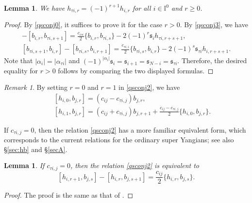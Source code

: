 \documentclass[11pt,reqno]{amsart}
\numberwithin{equation}{section}
\newtheorem{lem}[thm]{Lemma}
\theoremstyle{definition}
\theoremstyle{remark}
\newtheorem{rem}[thm]{Remark}
\newcommand{\beq}{\begin{equation}}
\newcommand{\eeq}{\end{equation}}
\newcommand{\fks}{\mathfrak{s}}
\newcommand{\gge}{\geqslant}
\newcommand{\ka}{{\mathfrak s}}
\def \H{h}
\def \X{b}
\def \I{\mathbb{I}}
\begin{document}
\begin{lem}\label{lem:sym-new}
We have $h_{\tau i,r}=(-1)^{r+1}h_{i,r}$ for all $i\in \I^0$ and $r\gge 0$.
\end{lem}
\begin{proof}
By \eqref{qsconj0}, it suffices to prove it for the case $r>0$. By \eqref{qsconj3}, we have
\begin{align*}
[\X_{i,r+1 },\X_{\tau i,s}]  - [\X_{i,r },\X_{\tau i,s+1 }] 
 =\frac{c_{i\tau i}}{2} \{\X_{i,r },\X_{\tau i,s }\}-2 (-1)^{r}\ka_i \H_{\tau i,r+s+1 },\\
[\X_{\tau i,s+1 },\X_{i,r }]   - [\X_{\tau i,s},\X_{i,r+1 }]
 =\frac{c_{\tau i, i}}{2} \{\X_{\tau i,s },\X_{i,r }\}-2 (-1)^{s}\ka_{\tau i} \H_{i,r+s+1 }.
\end{align*}
Note that $|\alpha_i|=|\alpha_{\tau i}|$ and $(-1)^{|\alpha_i|}\fks_i=\fks_{i+1}=\fks_{N-i}=\fks_{\tau i}$. Therefore, the desired equality for $r>0$ follows by comparing the two displayed formulas.
\end{proof}

\begin{rem}
By setting $r=0$ and $r=1$ in \eqref{qsconj2}, we have
\begin{align}
\label{qsconj5'}
&\quad [\H_{i,0},\X_{j,r}]=  (c_{ij}-c_{\tau i,j}) \X_{j,r},
\\\label{qsconj5}
&\quad [\H_{i,1},\X_{j,r}]=  (c_{ij}+c_{\tau i,j}) \X_{j,r+1}+\frac{ c_{ij}-c_{\tau i,j}}{2}\{\H_{i,0},\X_{j,r}\}.    
\end{align}
\end{rem}

If $c_{\tau i,j}=0$, then the relation \eqref{qsconj2} has a more familiar equivalent form, which corresponds to the current relations for the ordinary super Yangians; see also \S\ref{sec:hb} and \S\ref{secA}. 
\begin{lem}\label{lemalt}
If $c_{\tau i,j}=0$, then the relation \eqref{qsconj2} is equivalent to 
\beq\label{alt}
[h_{i,r+1},b_{j,s} ]-[h_{i,r},b_{j,s+1} ]= \frac{c_{ij}}{2} \{h_{i,r},b_{j,s}\}.
\eeq    
\end{lem}
\begin{proof}
The proof is the same as that of \cite[Lemma 3.3]{lu2024drinfeld}.
\end{proof}
\end{document}
